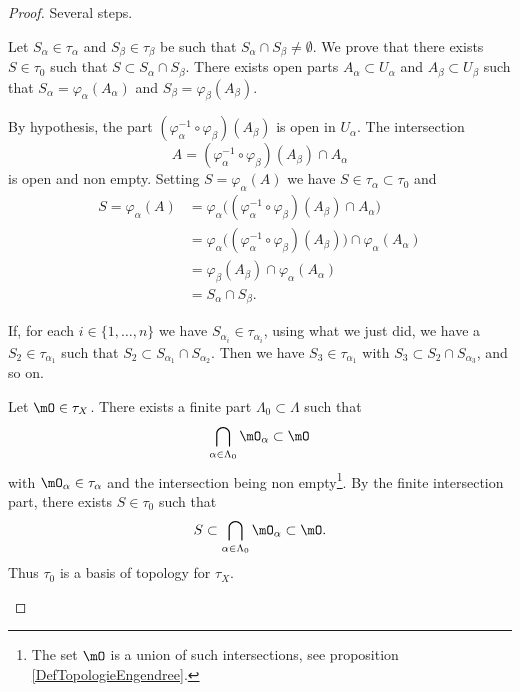 \begin{proof}
	Several steps.
	\begin{subproof}

		Let \( S_{\alpha}\in \tau_{\alpha}\) and \( S_{\beta}\in \tau_{\beta}\) be such that \( S_{\alpha}\cap S_{\beta}\neq \emptyset\). We prove that there exists \( S\in\tau_0\) such that \( S\subset S_{\alpha}\cap S_{\beta}\). There exists open parts \( A_{\alpha}\subset U_{\alpha}\) and \( A_{\beta}\subset U_{\beta}\) such that \( S_{\alpha}=\varphi_{\alpha}(A_{\alpha})\) and \( S_{\beta}=\varphi_{\beta}(A_{\beta})\).

		By hypothesis, the part \( (\varphi_{\alpha}^{-1}\circ\varphi_{\beta})(A_{\beta})\) is open in \( U_{\alpha}\). The intersection
		\begin{equation}
			A=(\varphi_{\alpha}^{-1}\circ\varphi_{\beta})(A_{\beta})\cap A_{\alpha}
		\end{equation}
		is open and non empty. Setting \( S=\varphi_{\alpha}(A)\) we have \( S\in\tau_{\alpha}\subset\tau_0\) and
		\begin{subequations}
			\begin{align}
				S=\varphi_{\alpha}(A) & = \varphi_{\alpha}\big( (\varphi_{\alpha}^{-1}\circ \varphi_{\beta})(A_{\beta})\cap A_{\alpha} \big)                  \\
				                      & = \varphi_{\alpha}\big( (\varphi_{\alpha}^{-1}\circ\varphi_{\beta})(A_{\beta}) \big)\cap \varphi_{\alpha}(A_{\alpha}) \\
				                      & = \varphi_{\beta}(A_{\beta})\cap\varphi_{\alpha}(A_{\alpha})                                                          \\
				                      & = S_{\alpha}\cap S_{\beta}.
			\end{align}
		\end{subequations}

		If, for each \( i\in\{ 1,\ldots,n \}\) we have \( S_{\alpha_i}\in \tau_{\alpha_i}\), using what we just did, we have a \( S_{2}\in \tau_{\alpha_1}\) such that \( S_2\subset S_{\alpha_1}\cap S_{\alpha_2}\). Then we have \( S_3\in\tau_{\alpha_1}\) with \( S_3\subset S_2\cap S_{\alpha_3}\), and so on.

		Let \( \mO\in \tau_X\). There exists a finite part \( \Lambda_0\subset \Lambda\) such that
		\begin{equation}
			\bigcap_{\alpha\in\Lambda_0}\mO_{\alpha}\subset\mO
		\end{equation}
		with \( \mO_{\alpha}\in\tau_{\alpha}\) and the intersection being non empty\footnote{The set \( \mO\) is a union of such intersections, see proposition \ref{DefTopologieEngendree}.}. By the finite intersection part, there exists \( S\in \tau_0\) such that
		\begin{equation}
			S\subset\bigcap_{\alpha\in\Lambda_0}\mO_{\alpha}\subset\mO.
		\end{equation}
		Thus \( \tau_0\) is a basis of topology for \( \tau_X\).


\end{subproof}
\end{proof}

